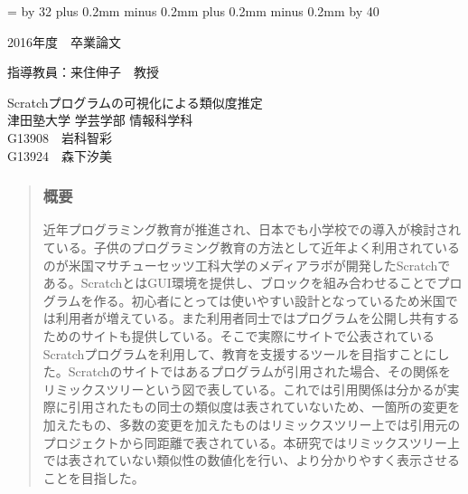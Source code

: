 \documentclass[a4paper,10pt,onecolumn,oneside,openany]{jsbook}
\def\linesparpage#1{\baselineskip=\textheight
   \divide\baselineskip by #1}
\def\kcharparline#1{%
   \ifx\xkanjiskip\undefined%
   \jintercharskip 0mm plus 0.2mm minus 0.2mm
   \else
   \xkanjiskip 0mm plus 0.2mm minus 0.2mm
   \fi
   \settowidth{\textwidth}{あ}%
   \multiply\textwidth by #1}
\begin{document}
\linesparpage{32} %
\kcharparline{40} %
\begin{titlepage}
\begin{flushleft}
{\large
2016年度　卒業論文 \\ 
}
\end{flushleft}
\begin{flushright}
{\large
指導教員：来住伸子　教授 \\ %
}
\end{flushright}

\begin{center}
\vspace{150truept}
{\huge Scratchプログラムの可視化による類似度推定}\\ %

\vspace{80truept}
{\huge 津田塾大学 学芸学部 情報科学科}\\
\vspace{30truept}
{\huge G13908　岩科智彩}\\ %
\vspace{10truept}
{\huge G13924　森下汐美}\\ %
\end{center}
\end{titlepage}

\frontmatter
\begin{abstract} %
\subsubsection{概要}
近年プログラミング教育が推進され、日本でも小学校での導入が検討されている。子供のプログラミング教育の方法として近年よく利用されているのが米国マサチューセッツ工科大学のメディアラボが開発したScratchである。ScratchとはGUI環境を提供し、ブロックを組み合わせることでプログラムを作る。初心者にとっては使いやすい設計となっているため米国では利用者が増えている。また利用者同士ではプログラムを公開し共有するためのサイトも提供している。そこで実際にサイトで公表されているScratchプログラムを利用して、教育を支援するツールを目指すことにした。Scratchのサイトではあるプログラムが引用された場合、その関係をリミックスツリーという図で表している。これでは引用関係は分かるが実際に引用されたもの同士の類似度は表されていないため、一箇所の変更を加えたもの、多数の変更を加えたものはリミックスツリー上では引用元のプロジェクトから同距離で表されている。本研究ではリミックスツリー上では表されていない類似性の数値化を行い、より分かりやすく表示させることを目指した。
\end{abstract}
\end{document}

